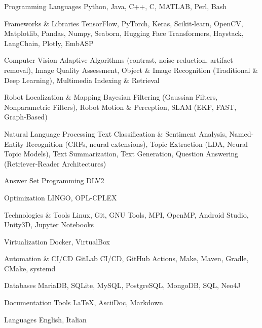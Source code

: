 

\begin{cvskills}
    
\cvskill
{Programming Languages}
{Python, Java, C++, C, MATLAB, Perl, Bash}

\cvskill
{Frameworks \& Libraries}
{TensorFlow, PyTorch, Keras, Scikit-learn, OpenCV, Matplotlib, Pandas, Numpy, Seaborn, Hugging Face Transformers, Haystack, LangChain, Plotly, EmbASP}

\cvskill
{Computer Vision}
{Adaptive Algorithms (contrast, noise reduction, artifact removal), Image Quality Assessment, Object \& Image Recognition (Traditional \& Deep Learning), Multimedia Indexing \& Retrieval}

\cvskill
{Robot Localization \& Mapping}
{Bayesian Filtering (Gaussian Filters, Nonparametric Filters), Robot Motion \& Perception, SLAM (EKF, FAST, Graph-Based)}

\cvskill
{Natural Language Processing}
{Text Classification \& Sentiment Analysis, Named-Entity Recognition (CRFs, neural extensions), Topic Extraction (LDA, Neural Topic Models), Text Summarization, Text Generation, Question Answering (Retriever-Reader Architectures)}

\cvskill
{Answer Set Programming}
{DLV2}

\cvskill
{Optimization}
{LINGO, OPL-CPLEX}

\cvskill
{Technologies \& Tools}
{Linux, Git, GNU Tools, MPI, OpenMP, Android Studio, Unity3D, Jupyter Notebooks}

\cvskill
{Virtualization}
{Docker, VirtualBox}

\cvskill
{Automation \& CI/CD}
{GitLab CI/CD, GitHub Actions, Make, Maven, Gradle, CMake, systemd}

\cvskill
{Databases}
{MariaDB, SQLite, MySQL, PostgreSQL, MongoDB, SQL, Neo4J}

\cvskill
{Documentation Tools}
{\LaTeX, AsciiDoc, Markdown}

\cvskill
{Languages}
{English, Italian}

\end{cvskills}
